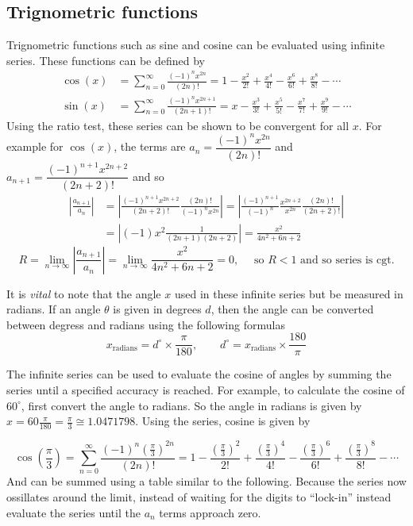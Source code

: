 \documentclass[11pt,a4paper,titlepage,oneside,openany]{article}
\begin{document}
\subsection*{Trignometric functions}
Trignometric functions such as sine and cosine can be evaluated using infinite series. These functions can be defined by
\begin{align*}
  \cos(x) &= \sum_{n=0}^{\infty} \frac{(-1)^n x^{2n}}{(2n)!}=1-\frac{x^2}{2!}+\frac{x^4}{4!}-\frac{x^6}{6!}+\frac{x^8}{8!}-\cdots\\
  \sin(x) &= \sum_{n=0}^{\infty} \frac{(-1)^n x^{2n+1}}{(2n+1)!}=x-\frac{x^3}{3!}+\frac{x^5}{5!}-\frac{x^7}{7!}+\frac{x^9}{9!}-\cdots
\end{align*}
Using the ratio test, these series can be shown to be convergent for all $x$. For example for $\cos(x)$, the terms are $a_{n}=\dfrac{(-1)^n x^{2n}}{(2n)!}$ and $a_{n+1}=\dfrac{(-1)^{n+1} x^{2n+2}}{(2n+2)!}$ and so
\begin{align*}
  \left| \frac{a_{n+1}}{a_n}\right|&=\left| \frac{(-1)^{n+1} x^{2n+2}}{(2n+2)!} \frac{(2n)!}{(-1)^n x^{2n}}\right|=\left|\frac{(-1)^{n+1}}{(-1)^{n}}\frac{x^{2n+2}}{x^{2n}}\frac{(2n)!}{(2n+2)!}\right|\\
  &=\left|(-1) x^2 \frac{1}{(2n+1)(2n+2)}\right|= \frac{x^2}{4n^2+6n+2}
\end{align*}
\begin{equation*}
  R=\lim_{n \to \infty}   \left| \frac{a_{n+1}}{a_n}\right| = \lim_{n \to \infty} \frac{x^2}{4n^2+6n+2} = 0, \quad \text{ so } R<1 \text{ and so series is cgt.}
\end{equation*}

It is \emph{vital} to note that the angle $x$ used in these infinite series but be measured in radians. If an angle $\theta$ is given in degrees $d$, then the angle can be converted between degress and radians using the following formulas
\begin{equation*}
  x_{\text{radians}} = d^{\circ} \times \frac{\pi}{180}, \qquad d^{\circ} = x_{\text{radians}} \times \frac{180}{\pi}
\end{equation*}

The infinite series can be used to evaluate the cosine of angles by summing the series until a specified accuracy is reached. For example, to calculate the cosine of $60^\circ$, first convert the angle to radians. So the angle in radians is given by $x= 60 \frac{\pi}{180}=\frac{\pi}{3}\cong1.0471798$. Using the series, cosine is given by

\begin{equation*}
  \cos(\frac{\pi}{3}) = \sum_{n=0}^{\infty} \frac{(-1)^n (\frac{\pi}{3})^{2n}}{(2n)!}=1-\frac{\left( \frac{\pi}{3} \right)^2}{2!}+\frac{\left( \frac{\pi}{3} \right)^4}{4!}-\frac{\left( \frac{\pi}{3} \right)^6}{6!}+\frac{\left( \frac{\pi}{3} \right)^8}{8!}-\cdots
\end{equation*}
And can be summed using a table similar to the following. Because the series now ossillates around the limit, instead of waiting for the digits to ``lock-in'' instead evaluate the series until the $a_n$ terms approach zero.
\\
\end{document}

